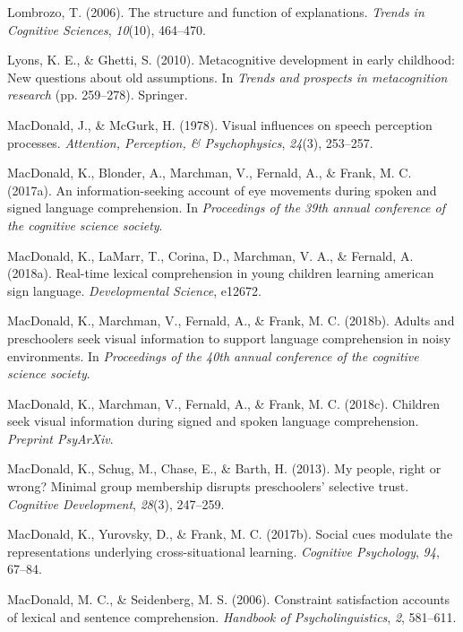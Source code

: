 \documentclass[oneside]{report}
\begin{document}
\hypertarget{ref-lombrozo2006structure}{}
Lombrozo, T. (2006). The structure and function of explanations.
\emph{Trends in Cognitive Sciences}, \emph{10}(10), 464--470.

\hypertarget{ref-lyons2010metacognitive}{}
Lyons, K. E., \& Ghetti, S. (2010). Metacognitive development in early
childhood: New questions about old assumptions. In \emph{Trends and
prospects in metacognition research} (pp. 259--278). Springer.

\hypertarget{ref-macdonald1978visual}{}
MacDonald, J., \& McGurk, H. (1978). Visual influences on speech
perception processes. \emph{Attention, Perception, \& Psychophysics},
\emph{24}(3), 253--257.

\hypertarget{ref-macdonald2017info}{}
MacDonald, K., Blonder, A., Marchman, V., Fernald, A., \& Frank, M. C.
(2017a). An information-seeking account of eye movements during spoken
and signed language comprehension. In \emph{Proceedings of the 39th
annual conference of the cognitive science society}.

\hypertarget{ref-macdonald2018real}{}
MacDonald, K., LaMarr, T., Corina, D., Marchman, V. A., \& Fernald, A.
(2018a). Real-time lexical comprehension in young children learning
american sign language. \emph{Developmental Science}, e12672.

\hypertarget{ref-macdonald2018noise}{}
MacDonald, K., Marchman, V., Fernald, A., \& Frank, M. C. (2018b).
Adults and preschoolers seek visual information to support language
comprehension in noisy environments. In \emph{Proceedings of the 40th
annual conference of the cognitive science society}.

\hypertarget{ref-macdonald2018speed}{}
MacDonald, K., Marchman, V., Fernald, A., \& Frank, M. C. (2018c).
Children seek visual information during signed and spoken language
comprehension. \emph{Preprint PsyArXiv}.

\hypertarget{ref-macdonald2013my}{}
MacDonald, K., Schug, M., Chase, E., \& Barth, H. (2013). My people,
right or wrong? Minimal group membership disrupts preschoolers'
selective trust. \emph{Cognitive Development}, \emph{28}(3), 247--259.

\hypertarget{ref-macdonald2017social}{}
MacDonald, K., Yurovsky, D., \& Frank, M. C. (2017b). Social cues
modulate the representations underlying cross-situational learning.
\emph{Cognitive Psychology}, \emph{94}, 67--84.

\hypertarget{ref-macdonald2006constraint}{}
MacDonald, M. C., \& Seidenberg, M. S. (2006). Constraint satisfaction
accounts of lexical and sentence comprehension. \emph{Handbook of
Psycholinguistics}, \emph{2}, 581--611.
\end{document}
